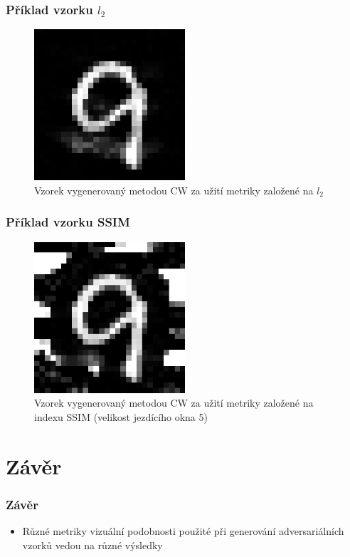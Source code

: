 \documentclass[czech]{beamer}
\begin{document}
\begin{frame}
    \frametitle{Příklad vzorku $l_2$}
    \begin{figure}
        \centering
        \includegraphics[width=0.5\textwidth]{Images/adv_pic.png}
        \centering
        \caption{Vzorek vygenerovaný metodou CW za užití metriky založené na $l_2$}
    \end{figure}
\end{frame}

\begin{frame}
    \frametitle{Příklad vzorku SSIM}
    \begin{figure}
        \centering
        \includegraphics[width=0.5\textwidth]{Images/dssim.png}
        \centering
        \caption{Vzorek vygenerovaný metodou CW za užití metriky založené na indexu SSIM (velikost jezdícího okna 5)}
    \end{figure}
\end{frame}



\section*{Závěr}

\begin{frame}
    \frametitle{Závěr}
    \begin{itemize}
        \item Různé metriky vizuální podobnosti použité při generování adversariálních vzorků vedou na různé výsledky
    \end{itemize}
\end{frame}
\end{document}
